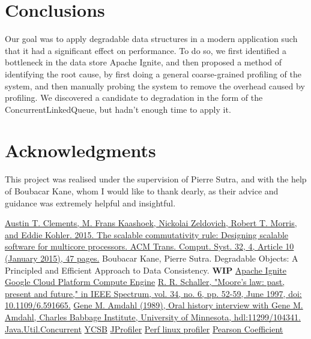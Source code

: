 \documentclass[conference]{IEEEtran}
\begin{document}
\bigbreak
\section{Conclusions}
Our goal was to apply degradable data structures in a modern application such that it had a significant effect on performance.
To do so, we first identified a bottleneck in the data store Apache Ignite, and then proposed a method of identifying the root cause, by first doing a general coarse-grained profiling of the system, and then manually probing the system to remove the overhead caused by profiling. We discovered a candidate to degradation in the form of the ConcurrentLinkedQueue, but hadn't enough time to apply it.


\bigbreak

\section{Acknowledgments}
This project was realised under the supervision of Pierre Sutra, and with the help of Boubacar Kane, whom I would like to thank dearly, as their advice and guidance was extremely helpful and insightful. 

\bigbreak

\begin{thebibliography}{00}
 \href{https://dl.acm.org/doi/10.1145/2699681}{Austin T. Clements, M. Frans Kaashoek, Nickolai Zeldovich, Robert T. Morris, and Eddie Kohler. 2015. The scalable commutativity rule: Designing scalable software for multicore processors. ACM Trans. Comput. Syst. 32, 4, Article 10 (January 2015), 47 pages.}
 Boubacar Kane, Pierre Sutra. Degradable Objects: A Principled and Efficient Approach to Data Consistency. \textbf{WIP}
 \href{https://ignite.apache.org/docs/latest/}{Apache Ignite}
 \href{https://cloud.google.com/compute/docs}{Google Cloud Platform Compute Engine}
 \href{https://ieeexplore.ieee.org/document/591665}{R. R. Schaller, "Moore's law: past, present and future," in IEEE Spectrum, vol. 34, no. 6, pp. 52-59, June 1997, doi: 10.1109/6.591665.}
 \href{https://conservancy.umn.edu/handle/11299/104341}{Gene M. Amdahl (1989), Oral history interview with Gene M. Amdahl, Charles Babbage Institute, University of Minnesota, hdl:11299/104341.}
 \href{https://docs.oracle.com/javase/8/docs/api/index.html?java/util/concurrent/package-summary.html}{Java.Util.Concurrent}
 \href{https://ycsb.site}{YCSB}
 \href{https://www.ej-technologies.com/products/jprofiler/overview.html}{JProfiler}
 \href{https://perf.wiki.kernel.org/index.php/Main_Page}{Perf linux profiler}
 \href{https://libguides.library.kent.edu/SPSS/PearsonCorr}{Pearson Coefficient}
\end{thebibliography}

\vspace{12pt}
\end{document}
